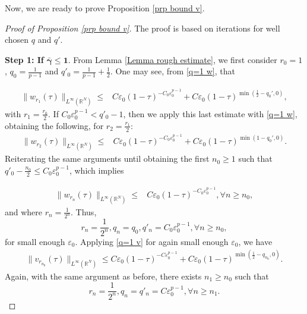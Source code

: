 \documentclass[11pt,a4paper]{article}
\newcommand{\1}{\mathbbm{1}}
\numberwithin{equation}{section}
\newcommand{\numberset}{\mathbb}
\newcommand{\R}{\numberset{R}}
\theoremstyle{remark}
\begin{document}
Now, we are ready to prove Proposition \ref{prp bound v}.
\begin{proof}[Proof of Proposition \ref{prp bound v}]
The proof is based on iterations for well chosen $q$ and $q'$. 

\textbf{Step 1: If} $\mathbf{\bar\gamma\leq 1}$. 
From Lemma \ref{Lemma rough estimate}, we first consider $r_0=1$, $q_0=\frac{1}{p-1}$ and $q'_0=\frac{1}{p-1}+\frac{1}{2}$. One may see, from \eqref{q=1 w}, that

\begin{equation*}
\begin{split}
\|w_{r_1}(\tau)\|_{L^\infty(\R^N)}\leq& C\varepsilon_0(1-\tau)^{-C_0\varepsilon_0^{p-1}}+C\varepsilon_0(1-\tau)^{\min(\frac{1}{2}-q_0',0)},
\end{split}
\end{equation*}
with $r_1=\frac{r_0}{2}$. If $C_0\varepsilon_0^{p-1}<q'_0-1$, then we apply this last estimate with \eqref{q=1 w}, obtaining the following, for $r_2=\frac{r_1}{2}$:
\begin{equation*}
\begin{split}
\|w_{r_2}(\tau)\|_{L^\infty(\R^N)}\leq& C\varepsilon_0(1-\tau)^{-C_0\varepsilon_0^{p-1}}+C\varepsilon_0(1-\tau)^{\min(1-q_0',0)}.
\end{split}
\end{equation*}
Reiterating the same arguments until obtaining the first $n_0\geq 1$ such that $q'_0-\frac{n_0}{2}\leq C_0\varepsilon_0^{p-1}$, which implies

\begin{equation*}
\begin{split}
\|w_{r_{n}}(\tau)\|_{L^\infty(\R^N)}\leq& C\varepsilon_0(1-\tau)^{-C_0\varepsilon_0^{p-1}}, \forall n\geq n_0,
\end{split}
\end{equation*}
and where $r_n=\frac{1}{2^n}$. Thus,
$$r_n=\frac{1}{2^{n}}, q_n=q_0,q'_n=C_0\varepsilon_0^{p-1}, \forall n\geq n_0,$$
for small enough $\varepsilon_0$. Applying \eqref{q=1 v} for again small enough $\varepsilon_0$, we have
\begin{equation}
\begin{split}
\| v_{r_{n_0}}(\tau)\|_{L^\infty(\R^N)}\leq C\varepsilon_0(1-\tau)^{-C\varepsilon_0^{p-1}}+C\varepsilon_0 (1-\tau)^{\min(\frac{1}{2}-q_{n_0},0)}.
\end{split}
\end{equation}
Again, with the same argument as before, there exists $n_1\geq n_0$ such that 
\begin{equation}\label{sequence r,q,q'}
r_n=\frac{1}{2^{n}}, q_n=q'_n=C\varepsilon_0^{p-1}, \forall n\geq n_1.
\end{equation}


\end{proof}
\end{document}
